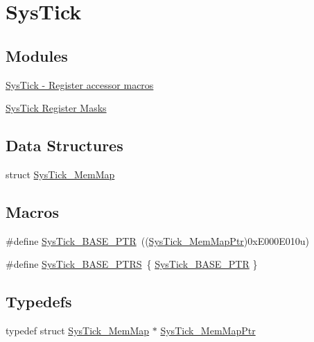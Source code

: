 \hypertarget{group___sys_tick___peripheral}{}\section{Sys\+Tick}
\label{group___sys_tick___peripheral}
\subsection*{Modules}
\begin{DoxyCompactItemize}
\item 
\hyperlink{group___sys_tick___register___accessor___macros}{Sys\+Tick -\/ Register accessor macros}
\item 
\hyperlink{group___sys_tick___register___masks}{Sys\+Tick Register Masks}
\end{DoxyCompactItemize}
\subsection*{Data Structures}
\begin{DoxyCompactItemize}
\item 
struct \hyperlink{struct_sys_tick___mem_map}{Sys\+Tick\+\_\+\+Mem\+Map}
\end{DoxyCompactItemize}
\subsection*{Macros}
\begin{DoxyCompactItemize}
\item 
\#define \hyperlink{group___sys_tick___peripheral_gaeef73642fdef722ce658e468dad877ea}{Sys\+Tick\+\_\+\+B\+A\+S\+E\+\_\+\+P\+T\+R}~((\hyperlink{group___sys_tick___peripheral_ga19e2a0c9400dcdfd462a92ca83cff253}{Sys\+Tick\+\_\+\+Mem\+Map\+Ptr})0x\+E000\+E010u)
\item 
\#define \hyperlink{group___sys_tick___peripheral_ga0c9d5fa2fdb81e177e61d0e980507c51}{Sys\+Tick\+\_\+\+B\+A\+S\+E\+\_\+\+P\+T\+R\+S}~\{ \hyperlink{group___sys_tick___peripheral_gaeef73642fdef722ce658e468dad877ea}{Sys\+Tick\+\_\+\+B\+A\+S\+E\+\_\+\+P\+T\+R} \}
\end{DoxyCompactItemize}
\subsection*{Typedefs}
\begin{DoxyCompactItemize}
\item 
typedef struct \hyperlink{struct_sys_tick___mem_map}{Sys\+Tick\+\_\+\+Mem\+Map} $\ast$ \hyperlink{group___sys_tick___peripheral_ga19e2a0c9400dcdfd462a92ca83cff253}{Sys\+Tick\+\_\+\+Mem\+Map\+Ptr}
\end{DoxyCompactItemize}


